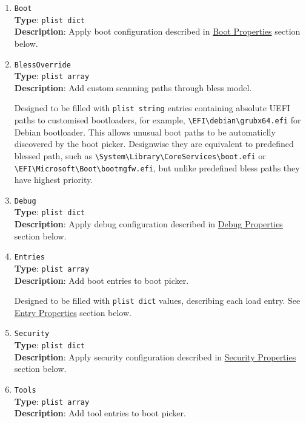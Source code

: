 \documentclass[]{article}
\makeatletter
\renewcommand{\label}[1]{%
\zref@wrapper@immediate{\oldlabel{#1}}}  %
\makeatother
\begin{document}
\begin{enumerate}
\item
  \texttt{Boot}\\
  \textbf{Type}: \texttt{plist\ dict}\\
  \textbf{Description}: Apply boot configuration described in
  \hyperref[miscbootprops]{Boot Properties} section below.

\item
  \texttt{BlessOverride}\\
  \textbf{Type}: \texttt{plist\ array}\\
  \textbf{Description}: Add custom scanning paths through bless model.

  Designed to be filled with \texttt{plist\ string} entries containing
  absolute UEFI paths to customised bootloaders, for example,
  \texttt{\textbackslash EFI\textbackslash debian\textbackslash grubx64.efi}
  for Debian bootloader. This allows unusual boot paths to be automaticlly
  discovered by the boot picker. Designwise they are equivalent to predefined blessed path, such as
  \texttt{\textbackslash System\textbackslash Library\textbackslash CoreServices\textbackslash boot.efi}
  or \texttt{\textbackslash EFI\textbackslash Microsoft\textbackslash Boot\textbackslash bootmgfw.efi},
  but unlike predefined bless paths they have highest priority.

\item
  \texttt{Debug}\\
  \textbf{Type}: \texttt{plist\ dict}\\
  \textbf{Description}: Apply debug configuration described in
  \hyperref[miscdebugprops]{Debug Properties} section below.

\item
  \texttt{Entries}\\
  \textbf{Type}: \texttt{plist\ array}\\
  \textbf{Description}: Add boot entries to boot picker.

  Designed to be filled with \texttt{plist\ dict} values, describing each load entry.
  See \hyperref[miscentryprops]{Entry Properties} section below.

\item
  \texttt{Security}\\
  \textbf{Type}: \texttt{plist\ dict}\\
  \textbf{Description}: Apply security configuration described in
  \hyperref[miscsecurityprops]{Security Properties} section below.

\item
  \texttt{Tools}\label{misctools}\\
  \textbf{Type}: \texttt{plist\ array}\\
  \textbf{Description}: Add tool entries to boot picker.


\end{enumerate}
\end{document}
